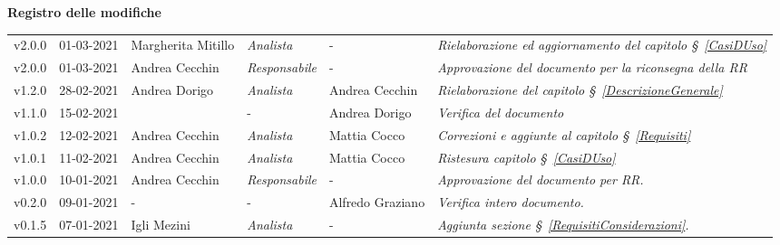 \quad
\begin{center}
	\LARGE\textbf{Registro delle modifiche}
\end{center}
\def\tabularxcolumn#1{m{#1}}
{

\begin{center}
	\renewcommand{\arraystretch}{1.4}
	\begin{longtable}[c]{|p{2cm-1\tabcolsep}|p{2cm}|p{3cm-2\tabcolsep}|p{}|p{}|p{4cm-2\tabcolsep}|}
		\hline
		\rowcolor{airforceblue}
		\makecell[c]{\textbf{Versione}} & \makecell[c]{\textbf{Data}} & \makecell[c]{\textbf{Autore}} & \makecell[c]{\textbf{Ruolo}} & \makecell[c]{\textbf{Verificatore}} & \makecell[c]{\textbf{Modifica}}\\
		\hline
		\centering v2.0.0 & 01-03-2021 & Margherita Mitillo & \centering \textit{Analista} & \centering - & \textit{Rielaborazione ed aggiornamento del capitolo \S~\ref{CasiDUso}} \\
		\hline
		\centering v2.0.0 & 01-03-2021 & Andrea Cecchin & \centering \textit{Responsabile} & \centering - & \textit{Approvazione del documento per la riconsegna della RR} \\
		\hline
		\centering v1.2.0 & 28-02-2021 & Andrea Dorigo & \centering \textit{Analista} & Andrea Cecchin & \textit{Rielaborazione del capitolo \S~\ref{DescrizioneGenerale}} \\
		\hline
		\hline
		\centering v1.1.0 & 15-02-2021 & \centering & \centering - & Andrea Dorigo & \textit{Verifica del documento} \\
		\hline
		\centering v1.0.2 & 12-02-2021 & Andrea Cecchin & \centering \textit{Analista} & Mattia Cocco & \textit{Correzioni e aggiunte al capitolo \S~\ref{Requisiti}} \\
		\hline
		\centering v1.0.1 & 11-02-2021 & Andrea Cecchin & \centering \textit{Analista} & Mattia Cocco & \textit{Ristesura capitolo \S~\ref{CasiDUso}} \\
		\hline
		\centering v1.0.0 & 10-01-2021 & Andrea Cecchin & \centering \textit{Responsabile} & \centering - & \textit{Approvazione del documento per RR.} \\
		\hline
		\centering v0.2.0 & 09-01-2021 & \centering - & \centering - & Alfredo Graziano & \textit{Verifica intero documento.} \\
		\hline
		\centering v0.1.5 & 07-01-2021 & Igli Mezini & \centering \textit{Analista} & \centering - & \textit{Aggiunta sezione \S~\ref{RequisitiConsiderazioni}.} \\

\end{longtable}
\end{center}}
